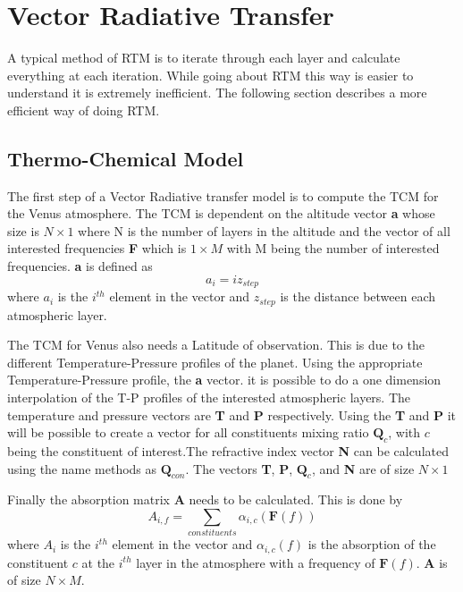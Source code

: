 \section{Vector Radiative Transfer}
A typical method of RTM is to iterate through each layer and calculate everything at each iteration. While going about RTM this way is easier to understand it is extremely inefficient. The following section describes a more efficient way of doing RTM.
\subsection{Thermo-Chemical Model}
The first step of a Vector Radiative transfer model is to compute the TCM for the Venus atmosphere. The TCM is dependent on the altitude vector \textbf{a} whose size is $N\times 1$ where N is the number of layers in the altitude and the vector of all interested frequencies \textbf{F} which is $1 \times M$ with M being the number of interested frequencies. \textbf{a} is defined as
\begin{equation}
a_i = iz_{step}
\end{equation}
where $a_i$ is the $i^{th}$ element in the vector and $z_{step}$ is the distance between each atmospheric layer. 

The TCM for Venus also needs a Latitude of observation. This is due to the different Temperature-Pressure profiles of the planet. Using the appropriate Temperature-Pressure profile, the \textbf{a} vector. it is possible to do a one dimension interpolation of the T-P profiles of the interested atmospheric layers. The temperature and pressure vectors are \textbf{T} and \textbf{P} respectively. Using the \textbf{T} and \textbf{P} it will be possible to create a vector for all constituents mixing ratio $\textbf{Q}_{c}$, with $c$ being the constituent of interest.The refractive index vector \textbf{N} can be calculated using the name methods as $\textbf{Q}_{con}$. The vectors \textbf{T}, \textbf{P}, $\textbf{Q}_{c}$, and \textbf{N} are of size $N\times 1$


Finally the absorption matrix \textbf{A} needs to be calculated. This is done by
\begin{equation}
A_{i,f} = \sum_{constituents} \alpha_{i,c}(\textbf{F}(f))
\end{equation}
where $A_i$ is the $i^{th}$ element in the vector and $\alpha_{i,c}(f)$ is the absorption of the constituent $c$ at the $i^{th}$ layer in the atmosphere with a frequency of $\textbf{F}(f)$. \textbf{A} is of size $N \times M$.

